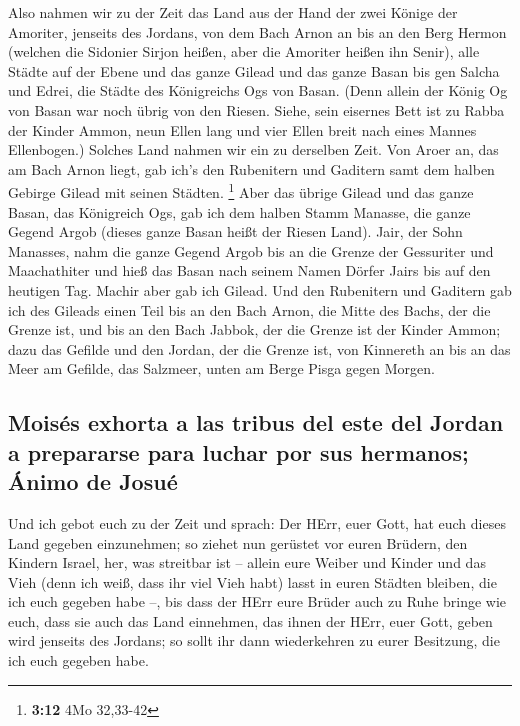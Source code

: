  Also nahmen wir zu der Zeit das Land aus der Hand der
zwei Könige der Amoriter, jenseits des Jordans, von dem Bach Arnon an
bis an den Berg Hermon  (welchen die Sidonier Sirjon
heißen, aber die Amoriter heißen ihn Senir),  alle Städte
auf der Ebene und das ganze Gilead und das ganze Basan bis gen Salcha
und Edrei, die Städte des Königreichs Ogs von Basan. 
(Denn allein der König Og von Basan war noch übrig von den Riesen.
Siehe, sein eisernes Bett ist zu Rabba der Kinder Ammon, neun Ellen lang
und vier Ellen breit nach eines Mannes Ellenbogen.) 
Solches Land nahmen wir ein zu derselben Zeit. Von Aroer an, das am Bach
Arnon liegt, gab ich's den Rubenitern und Gaditern samt dem halben
Gebirge Gilead mit seinen Städten. \footnote{\textbf{3:12} 4Mo 32,33-42}
 Aber das übrige Gilead und das ganze Basan, das
Königreich Ogs, gab ich dem halben Stamm Manasse, die ganze Gegend Argob
(dieses ganze Basan heißt der Riesen Land).  Jair, der
Sohn Manasses, nahm die ganze Gegend Argob bis an die Grenze der
Gessuriter und Maachathiter und hieß das Basan nach seinem Namen Dörfer
Jairs bis auf den heutigen Tag.  Machir aber gab ich
Gilead.  Und den Rubenitern und Gaditern gab ich des
Gileads einen Teil bis an den Bach Arnon, die Mitte des Bachs, der die
Grenze ist, und bis an den Bach Jabbok, der die Grenze ist der Kinder
Ammon;  dazu das Gefilde und den Jordan, der die Grenze
ist, von Kinnereth an bis an das Meer am Gefilde, das Salzmeer, unten am
Berge Pisga gegen Morgen.

\hypertarget{moisuxe9s-exhorta-a-las-tribus-del-este-del-jordan-a-prepararse-para-luchar-por-sus-hermanos-uxe1nimo-de-josuuxe9}{%
\subsection{Moisés exhorta a las tribus del este del Jordan a prepararse
para luchar por sus hermanos; Ánimo de
Josué}\label{moisuxe9s-exhorta-a-las-tribus-del-este-del-jordan-a-prepararse-para-luchar-por-sus-hermanos-uxe1nimo-de-josuuxe9}}

 Und ich gebot euch zu der Zeit und sprach: Der HErr,
euer Gott, hat euch dieses Land gegeben einzunehmen; so ziehet nun
gerüstet vor euren Brüdern, den Kindern Israel, her, was streitbar ist
--  allein eure Weiber und Kinder und das Vieh (denn ich
weiß, dass ihr viel Vieh habt) lasst in euren Städten bleiben, die ich
euch gegeben habe --,  bis dass der HErr eure Brüder auch
zu Ruhe bringe wie euch, dass sie auch das Land einnehmen, das ihnen der
HErr, euer Gott, geben wird jenseits des Jordans; so sollt ihr dann
wiederkehren zu eurer Besitzung, die ich euch gegeben habe.

